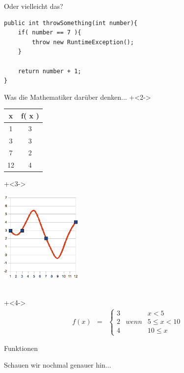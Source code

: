 \begin{frame}[fragile]{Oder vielleicht das?}
\begin{lstlisting}
public int throwSomething(int number){
    if( number == 7 ){
        throw new RuntimeException();
    }
    
    return number + 1;
}
\end{lstlisting}
\end{frame}


\begin{frame}[fragile]{Was die Mathematiker darüber denken...}
\onslide+<2->
\begin{minipage}[t]{3.5cm}
\begin{tabular}{|c|c|}
\textbf{x} & \textbf{f( x )}  \\ \hline
1 & 3  \\
3 & 3  \\
7 & 2  \\
12 & 4
\end{tabular} 
\end{minipage} 
\hfill
\onslide+<3->
\begin{minipage}[t]{5.5cm}
\includegraphics[height=4.5cm]{1Funktion.jpg}
\end{minipage}
~ \\
\onslide+<4->
\begin{eqnarray*}
f(x) &=& \left\{ 
\begin{array}{lll}
3 & & x < 5 \\
2 & wenn & 5 \leq x < 10 \\
4 & & 10 \leq x
\end{array} \right.
\end{eqnarray*}

\end{frame}


\begin{frame}[fragile]{Funktionen}
\begin{center}
\Large
Schauen wir nochmal genauer hin...
\end{center}
\end{frame}


